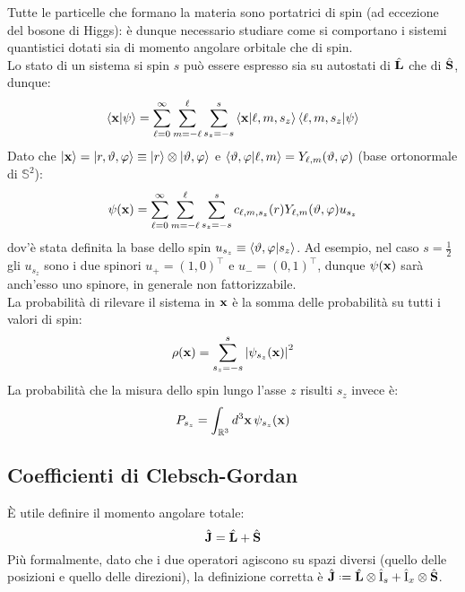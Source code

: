 Tutte le particelle che formano la materia sono portatrici di spin (ad eccezione del bosone di Higgs): è dunque necessario studiare come si comportano i sistemi quantistici dotati sia di momento angolare orbitale che di spin.\\
Lo stato di un sistema si spin $ s $ può essere espresso sia su autostati di $ \hat{\mathbf{L}} $ che di $ \hat{\mathbf{S}} $, dunque:
\begin{equation}
	\braket{\mathbf{x} | \psi} = \sum_{\ell = 0}^{\infty} \sum_{m = -\ell}^{\ell} \sum_{s_z = -s}^{s} \braket{\mathbf{x} | \ell,m,s_z} \braket{\ell,m,s_z | \psi}
	\label{eq:2.51}
\end{equation}
Dato che $ \ket{\mathbf{x}} = \ket{r,\vartheta,\varphi} \equiv \ket{r} \otimes \ket{\vartheta,\varphi} $ e $ \braket{\vartheta,\varphi | \ell,m} = Y_{\ell,m}(\vartheta,\varphi) $ (base ortonormale di $ \mathbb{S}^2 $):
\begin{equation}
	\psi(\mathbf{x}) = \sum_{\ell = 0}^{\infty} \sum_{m = -\ell}^{\ell} \sum_{s_z = -s}^{s} c_{\ell,m,s_z}(r) Y_{\ell,m}(\vartheta,\varphi) u_{s_z}
	\label{eq:2.52}
\end{equation}
dov'è stata definita la base dello spin $ u_{s_z} \equiv \braket{\vartheta,\varphi | s_z} $. Ad esempio, nel caso $ s = \frac{1}{2} $ gli $ u_{s_z} $ sono i due spinori $ u_+ = (1, 0)^{\intercal} $ e $ u_- = (0,1)^{\intercal} $, dunque $ \psi(\mathbf{x}) $ sarà anch'esso uno spinore, in generale non fattorizzabile.\\
La probabilità di rilevare il sistema in $ \mathbf{x} $ è la somma delle probabilità su tutti i valori di spin:
\begin{equation}
	\rho(\mathbf{x}) = \sum_{s_z = -s}^{s} \left\lvert\psi_{s_z}(\mathbf{x})\right\rvert^2
	\label{eq:2.53}
\end{equation}
La probabilità che la misura dello spin lungo l'asse $ z $ risulti $ s_z $ invece è:
\begin{equation}
	P_{s_z} = \int_{\mathbb{R}^3} d^3\mathbf{x} \,\psi_{s_z}(\mathbf{x})
	\label{eq:2.54}
\end{equation}

\subsection{Coefficienti di Clebsch-Gordan}

È utile definire il momento angolare totale:
\begin{equation}
	\hat{\mathbf{J}} = \hat{\mathbf{L}} + \hat{\mathbf{S}}
	\label{eq:2.55}
\end{equation}
Più formalmente, dato che i due operatori agiscono su spazi diversi (quello delle posizioni e quello delle direzioni), la definizione corretta è $ \hat{\ve{J}} \defeq \hat{\ve{L}} \otimes \hat{\tens{I}}_s + \hat{\tens{I}}_x \otimes \hat{\ve{S}} $.


